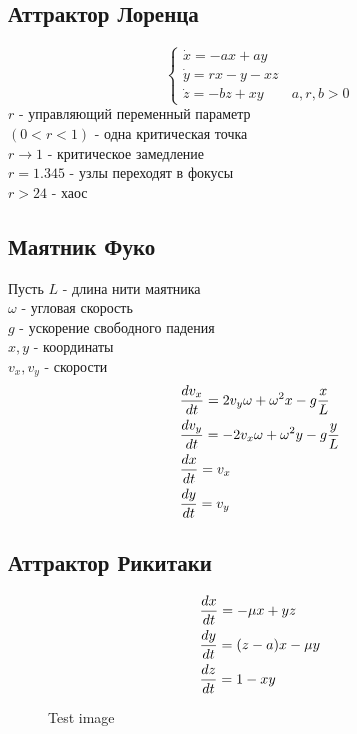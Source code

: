 \subsection{Аттрактор Лоренца}
\begin{equation}
  \begin{cases}
    \dot{x}=-ax+ay\\
    \dot{y}=rx-y-xz\\
    \dot{z}=-bz+xy \qquad a,r,b>0
  \end{cases}
\end{equation}
$r$ - управляющий переменный параметр\\
$(0<r<1)$ - одна критическая точка\\
$r\to 1$ - критическое замедление\\
$r=1.345$ - узлы переходят в фокусы\\
$r>24$ - хаос

\subsection{Маятник Фуко}
Пусть $L$ - длина нити маятника\\
$\omega$ - угловая скорость\\
$g$ - ускорение свободного падения\\
$x,y$ - координаты\\
$v_x, v_y$ - скорости
\begin{align}
  &\dfrac{d v_x}{dt} = 2v_y\omega+\omega^2x-g\dfrac{x}{L}\notag\\
  &\dfrac{d v_y}{dt} = -2v_x\omega+\omega^2y-g\dfrac{y}{L}\\
  &\dfrac{d x}{dt} = v_x\notag\\
  &\dfrac{d y}{dt} = v_y\notag
\end{align}
\subsection{Аттрактор Рикитаки}
\begin{align}
  &\dfrac{d x}{dt} = -\mu x+yz \notag\\
  &\dfrac{d y}{dt} = (z-a)x-\mu y\\
  &\dfrac{d z}{dt} = 1-xy\notag
\end{align}

\begin{figure}[ht]
\caption{Test image}
\label{figure:image}
\end{figure}

% 
